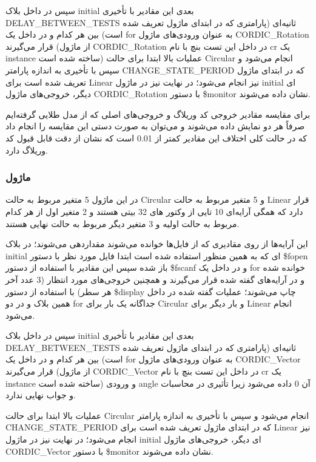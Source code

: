 \documentclass[12pt,titlepage,a4page , tikz , multi,table , svgnames,xcdraw]{article}
\begin{document}
سپس در داخل بلاک initial بعدی این مقادیر با تأخیری DELAY\_BETWEEN\_TESTS ثانیه‌ای (پارامتری که در ابتدای ماژول تعریف شده است) بین هر کدام و در داخل یک for به عنوان ورودی‌های ماژول CORDIC\_Rotation قرار می‌گیرند (از ماژول CORDIC\_Rotation در داخل این تست بنچ با نام cr یک instance ساخته شده است)
عملیات بالا ابتدا برای حالت Circular انجام می‌شود و سپس با تأخیری به اندازه پارامتر CHANGE\_STATE\_PERIOD که در ابتدای ماژول تعریف شده است برای Linear نیز انجام می‌شود؛ در نهایت نیز در ماژول initial ای دیگر، خروجی‌های ماژول CORDIC\_Rotation با دستور \$monitor نشان داده می‌شوند.

برای مقایسه مقادیر خروجی کد وریلاگ و خروجی‌های اصلی که از مدل طلایی گرفته‌ایم صرفاً هر دو نمایش داده می‌شوند و می‌توان به صورت دستی این مقایسه را انجام داد که در حالت کلی اختلاف این مقادیر کمتر از 0.01 است که نشان از دقت قابل قبول کد وریلاگ دارد.


\subsubsection{ماژول }



در این ماژول 5 متغیر مربوط به حالت Circular و 5 متغیر مربوط به حالت Linear قرار دارد که همگی آرایه‌ای 10 تایی از وکتور های 32 بیتی هستند و 2 متغیر اول از هر کدام مربوط به حالت اولیه و 3 متغیر دیگر مربوط به حالت نهایی هستند.


این آرایه‌ها از روی مقادیری که از فایل‌ها خوانده می‌شوند مقداردهی می‌شوند؛ در بلاک initial ای که به همین منظور استفاده شده است ابتدا فایل مورد نظر با دستور \$fopen باز شده سپس این مقادیر با استفاده از دستور \$fscanf و در داخل یک for خوانده شده و در آرایه‌های گفته شده قرار می‌گیرند و همچنین خروجی‌های مورد انتظار (3 عدد آخر هر سطر) با استفاده از دستور \$display چاپ می‌شوند؛ عملیات گفته شده در داخل همین بلاک و در دو for جداگانه یک بار برای Circular و بار دیگر برای Linear انجام می‌شود.


سپس در داخل بلاک initial بعدی این مقادیر با تأخیری DELAY\_BETWEEN\_TESTS ثانیه‌ای (پارامتری که در ابتدای ماژول تعریف شده است) بین هر کدام و در داخل یک for به عنوان ورودی‌های ماژول CORDIC\_Vector قرار می‌گیرند (از ماژول CORDIC\_Vector در داخل این تست بنچ با نام cr یک instance ساخته شده است) و ورودی angle آن 0 داده می‌شود زیرا تأثیری در محاسبات و جواب نهایی ندارد.


عملیات بالا ابتدا برای حالت Circular انجام می‌شود و سپس با تأخیری به اندازه پارامتر CHANGE\_STATE\_PERIOD که در ابتدای ماژول تعریف شده است برای Linear نیز انجام می‌شود؛ در نهایت نیز در ماژول initial ای دیگر، خروجی‌های ماژول CORDIC\_Vector با دستور \$monitor نشان داده می‌شوند.
\end{document}
